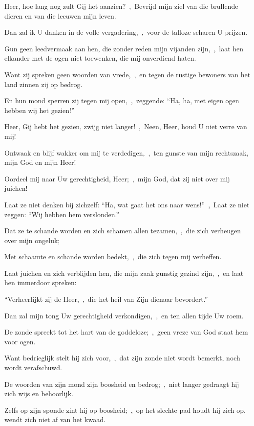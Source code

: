 \documentclass[12pt,twoside,a5paper]{article}
\begin{document}

\begin{halfparskip}
  Heer, hoe lang nog zult Gij het aanzien?~\sep\ Bevrijd mijn ziel van die brullende dieren en van die leeuwen mijn leven.

  Dan zal ik U danken in de volle vergadering,~\sep\ voor de talloze scharen U prijzen.

  Gun geen leedvermaak aan hen, die zonder reden mijn vijanden zijn,~\sep\ laat hen elkander met de ogen niet toewenken, die mij onverdiend haten.

  Want zij spreken geen woorden van vrede,~\sep\ en tegen de rustige bewoners van het land zinnen zij op bedrog.

  En hun mond sperren zij tegen mij open,~\sep\ zeggende: ``Ha, ha, met eigen ogen hebben wij het gezien!''

  Heer, Gij hebt het gezien, zwijg niet langer!~\sep\ Neen, Heer, houd U niet verre van mij!

  Ontwaak en blijf wakker om mij te verdedigen,~\sep\ ten gunste van mijn rechtszaak, mijn God en mijn Heer!

  Oordeel mij naar Uw gerechtigheid, Heer;~\sep\ mijn God, dat zij niet over mij juichen!

  Laat ze niet denken bij zichzelf: ``Ha, wat gaat het ons naar wens!''~\sep\ Laat ze niet zeggen: ``Wij hebben hem verslonden.''

  Dat ze te schande worden en zich schamen allen tezamen,~\sep\ die zich verheugen over mijn ongeluk;

  Met schaamte en schande worden bedekt,~\sep\ die zich tegen mij verheffen.

  Laat juichen en zich verblijden hen, die mijn zaak gunstig gezind zijn,~\sep\ en laat hen immerdoor spreken:

  ``Verheerlijkt zij de Heer,~\sep\ die het heil van Zijn dienaar bevordert.''

  Dan zal mijn tong Uw gerechtigheid verkondigen,~\sep\ en ten allen tijde Uw roem.
\end{halfparskip}



\begin{halfparskip}
  De zonde spreekt tot het hart van de goddeloze;~\sep\ geen vreze van God staat hem voor ogen.


  Want bedrieglijk stelt hij zich voor,~\sep\ dat zijn zonde niet wordt bemerkt, noch wordt verafschuwd.

  De woorden van zijn mond zijn boosheid en bedrog;~\sep\ niet langer gedraagt hij zich wijs en behoorlijk.

  Zelfs op zijn sponde zint hij op boosheid;~\sep\ op het slechte pad houdt hij zich op, wendt zich niet af van het kwaad.
\end{halfparskip}
\end{document}
